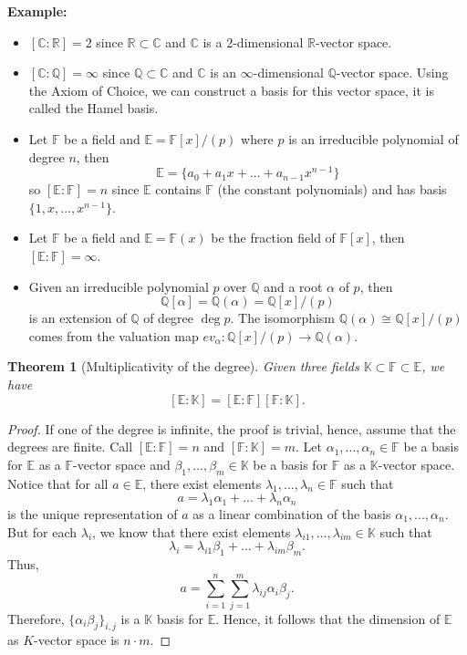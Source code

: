 \documentclass{article}
\newtheorem*{theorem}{Theorem}
\newcommand{\C}{\mathbb{C}}
\newcommand{\R}{\mathbb{R}}
\newcommand{\Q}{\mathbb{Q}}
\newcommand{\F}{\mathbb{F}}
\newcommand{\E}{\mathbb{E}}
\newcommand{\K}{\mathbb{K}}
\newcommand{\isomorphic}{\cong}
\newenvironment{example}{\noindent\textbf{Example:} \vspace{-0.2cm}\begin{itemize}}{\end{itemize}}
\begin{document}
\begin{example}
    \item $[\C : \R] = 2$ since $\R \subset \C$ and $\C$ is a 2-dimensional $\R$-vector space.
    \item $[\C : \Q] = \infty$ since $\Q \subset \C$ and $\C$ is an $\infty$-dimensional $\Q$-vector space. Using the Axiom of Choice, we can construct a basis for this vector space, it is called the Hamel basis.
    \item Let $\F$ be a field and $\E = \F[x]/(p)$ where $p$ is an irreducible polynomial of degree $n$, then 
    $$\E = \{a_0 + a_1x + ... + a_{n-1}x^{n-1}\}$$
    so $[\E : \F] = n$ since $\E$ contains $\F$ (the constant polynomials) and has basis $\{1, x, ..., x^{n-1}\}$.
    \item Let $\F$ be a field and $\E = \F(x)$ be the fraction field of $\F[x]$, then $[\E : \F] = \infty$.
    \item Given an irreducible polynomial $p$ over $\Q$ and a root $\alpha$ of $p$, then 
    $$\Q[\alpha] = \Q(\alpha) = \Q[x] /(p)$$
    is an extension of $\Q$ of degree $\deg p$. The isomorphism $\Q(\alpha) \isomorphic \Q[x] /(p)$ comes from the valuation map $ev_\alpha : \Q[x] /(p) \to \Q(\alpha)$.
\end{example}

\begin{theorem}[Multiplicativity of the degree]
    Given three fields $\K \subset \F \subset \E$, we have
    $$[\E : \K] = [\E : \F] [\F : \K].$$
\end{theorem}

\begin{proof}
    If one of the degree is infinite, the proof is trivial, hence, assume that the degrees are finite. Call $[\E : \F] = n$ and $[\F : \K] = m$. Let $\alpha_1, ..., \alpha_n \in \F$ be a basis for $\E$ as a $\F$-vector space and $\beta_1, ..., \beta_m \in \K$ be a basis for $\F$ as a $\K$-vector space. Notice that for all $a \in \E$, there exist elements $\lambda_1, ..., \lambda_n \in \F$ such that
    $$a = \lambda_1 \alpha_1  + ... + \lambda_n \alpha_n$$
    is the unique representation of $a$ as a linear combination of the basis $\alpha_1, ..., \alpha_n$. But for each $\lambda_i$, we know that there exist elements $\lambda_{i1}, ..., \lambda_{im} \in \K$ such that 
    $$\lambda_i = \lambda_{i1}\beta_1 + ... + \lambda_{im}\beta_m.$$ Thus,
    $$a = \sum_{i=1}^{n}\sum_{j=1}^{m}\lambda_{ij}\alpha_i \beta_j.$$
    Therefore, $\{\alpha_i \beta_j\}_{i,j}$ is a $\K$ basis for $\E$. Hence, it follows that the dimension of $\E$ as $K$-vector space is $n\cdot m$.
\end{proof}
\end{document}
